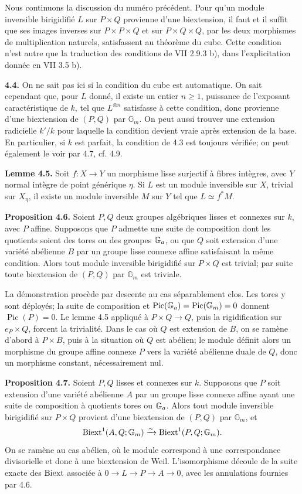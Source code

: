 \documentclass[11pt]{article}
\providecommand{\Pic}{\operatorname{Pic}}
\providecommand{\Gm}{\mathbb G_m}
\begin{document}
Nous continuons la discussion du numéro précédent.  Pour qu'un module inversible birigidifié \(L\) sur \(P\times Q\) provienne d'une biextension, il faut et il suffit que ses images inverses sur \(P\times P\times Q\) et sur \(P\times Q\times Q\), par les deux morphismes de multiplication naturels, satisfassent au théorème du cube.  Cette condition n'est autre que la traduction des conditions de VII 2.9.3 b), dans l'explicitation donnée en VII 3.5 b).

\textbf{4.4.}  On ne sait pas ici si la condition du cube est automatique.  On sait cependant que, pour \(L\) donné, il existe un entier \(n\geq 1\), puissance de l'exposant caractéristique de \(k\), tel que \(L^{\otimes n}\) satisfasse à cette condition, donc provienne d'une biextension de \((P,Q)\) par \(\Gm\).  On peut aussi trouver une extension radicielle \(k'/k\) pour laquelle la condition devient vraie après extension de la base.  En particulier, si \(k\) est parfait, la condition de 4.3 est toujours vérifiée; on peut également le voir par 4.7, cf. 4.9.

\textbf{Lemme 4.5.}  Soit \(f:X\to Y\) un morphisme lisse surjectif à fibres intègres, avec \(Y\) normal intègre de point générique \(\eta\).  Si \(L\) est un module inversible sur \(X\), trivial sur \(X_\eta\), il existe un module inversible \(M\) sur \(Y\) tel que \(L\simeq f^*M\).

\textbf{Proposition 4.6.}  Soient \(P,Q\) deux groupes algébriques lisses et connexes sur \(k\), avec \(P\) affine.  Supposons que \(P\) admette une suite de composition dont les quotients soient des tores ou des groupes \(\mathbb G_a\), ou que \(Q\) soit extension d'une variété abélienne \(B\) par un groupe lisse connexe affine satisfaisant la même condition.  Alors tout module inversible birigidifié sur \(P\times Q\) est trivial; par suite toute biextension de \((P,Q)\) par \(\Gm\) est triviale.

La démonstration procède par descente au cas séparablement clos.  Les tores y sont déployés; la suite de composition et \(\Pic(\Ga)=\Pic(\Gm)=0\) donnent \(\Pic(P)=0\).  Le lemme 4.5 appliqué à \(P\times Q\to Q\), puis la rigidification sur \(e_P\times Q\), forcent la trivialité.  Dans le cas où \(Q\) est extension de \(B\), on se ramène d'abord à \(P\times B\), puis à la situation où \(Q\) est abélien; le module définit alors un morphisme du groupe affine connexe \(P\) vers la variété abélienne duale de \(Q\), donc un morphisme constant, nécessairement nul.

\textbf{Proposition 4.7.}  Soient \(P,Q\) lisses et connexes sur \(k\).  Supposons que \(P\) soit extension d'une variété abélienne \(A\) par un groupe lisse connexe affine ayant une suite de composition à quotients tores ou \(\mathbb G_a\).  Alors tout module inversible birigidifié sur \(P\times Q\) provient d'une biextension de \((P,Q)\) par \(\Gm\), et
\[
  \Biext^1(A,Q;\Gm)\xrightarrow{\sim}\Biext^1(P,Q;\Gm).
\]
On se ramène au cas abélien, où le module correspond à une correspondance divisorielle et donc à une biextension de Weil.  L'isomorphisme découle de la suite exacte des \(\operatorname{Biext}\) associée à \(0\to L\to P\to A\to0\), avec les annulations fournies par 4.6.
\end{document}
